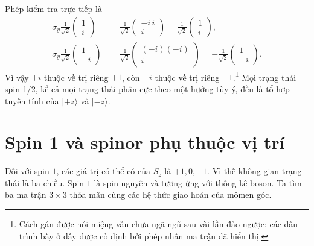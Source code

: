 \begin{classroomqa}
\end{classroomqa}

Phép kiểm tra trực tiếp là
\begin{align}
\sigma_y\frac{1}{\sqrt2}
\begin{pmatrix}
1\\
i
\end{pmatrix}
&=
\frac{1}{\sqrt2}
\begin{pmatrix}
-i\,i\\
i
\end{pmatrix}
=
\frac{1}{\sqrt2}
\begin{pmatrix}
1\\
i
\end{pmatrix},\\
\sigma_y\frac{1}{\sqrt2}
\begin{pmatrix}
1\\
-i
\end{pmatrix}
&=
\frac{1}{\sqrt2}
\begin{pmatrix}
(-i)(-i)\\
i
\end{pmatrix}
=
-\frac{1}{\sqrt2}
\begin{pmatrix}
1\\
-i
\end{pmatrix}.
\end{align}
Vì vậy \(+i\) thuộc về trị riêng \(+1\), còn \(-i\) thuộc về trị riêng \(-1\).\footnote{Cách gán được nói miệng vẫn chưa ngã ngũ sau vài lần đảo ngược; các dấu trình bày ở đây được cố định bởi phép nhân ma trận đã hiển thị.} Mọi trạng thái spin 1/2, kể cả mọi trạng thái phân cực theo một hướng tùy ý, đều là tổ hợp tuyến tính của \(|+z\rangle\) và \(|-z\rangle\).

\section{Spin 1 và spinor phụ thuộc vị trí}

Đối với spin \(1\), các giá trị có thể có của \(S_z\) là \(+1,0,-1\). Vì thế không gian trạng thái là ba chiều. Spin \(1\) là spin nguyên và tương ứng với thống kê boson. Ta tìm ba ma trận \(3\times3\) thỏa mãn cùng các hệ thức giao hoán của mômen góc.

